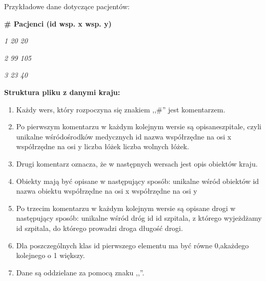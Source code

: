 ﻿\documentclass{article}
\begin{document}
\noindent {}

\noindent Przyk{\l}adowe dane dotycz\k{a}ce pacjent\'{o}w:

\noindent {}

\noindent \textbf{\# Pacjenci (id {\textbar} wsp. x {\textbar} wsp. y)}

\noindent \textit {1 {\textbar} 20 {\textbar} 20}

\noindent \textit {2 {\textbar} 99 {\textbar} 105}

\noindent \textit {3 {\textbar} 23 {\textbar} 40}

\noindent {}

\noindent \textbf{Struktura pliku z danymi kraju:}

\begin{enumerate}
\item  Ka\.{z}dy wers, kt\'{o}ry rozpoczyna si\k{e} znakiem ,,\#'' jest komentarzem.

\item  Po pierwszym komentarzu w ka\.{z}dym kolejnym wersie s\k{a} opisaneszpitale, czyli unikalne w\'{s}r\'{o}do\'{s}rodk\'{o}w medycznych id{\textbar} nazwa {\textbar} wsp\'{o}{\l}rz\k{e}dne na osi x {\textbar} wsp\'{o}{\l}rz\k{e}dne na osi y {\textbar} liczba {\l}\'{o}\.{z}ek {\textbar} liczba wolnych {\l}\'{o}\.{z}ek.

\noindent 

\item  Drugi komentarz oznacza, \.{z}e w nast\k{e}pnych wersach jest opis obiekt\'{o}w kraju.

\item  Obiekty maj\k{a} by\'{c} opisane w nast\k{e}puj\k{a}cy spos\'{o}b: unikalne w\'{s}r\'{o}d obiekt\'{o}w id {\textbar} nazwa obiektu {\textbar} wsp\'{o}{\l}rz\k{e}dne na osi x {\textbar} wsp\'{o}{\l}rz\k{e}dne na osi y

\item  Po trzecim komentarzu w ka\.{z}dym kolejnym wersie s\k{a} opisane drogi w nast\k{e}puj\k{a}cy spos\'{o}b: unikalne w\'{s}r\'{o}d dr\'{o}g id{\textbar} id szpitala, z kt\'{o}rego wyje\.{z}d\.{z}amy {\textbar} id szpitala, do kt\'{o}rego prowadzi droga {\textbar} d{\l}ugo\'{s}\'{c} drogi.

\item  Dla poszczeg\'{o}lnych klas id pierwszego elementu ma by\'{c} r\'{o}wne 0,aka\.{z}dego kolejnego o 1 wi\k{e}kszy.

\item  Dane s\k{a} oddzielane za pomoc\k{a} znaku ,,{\textbar}''.


\end{enumerate}
\end{document}
